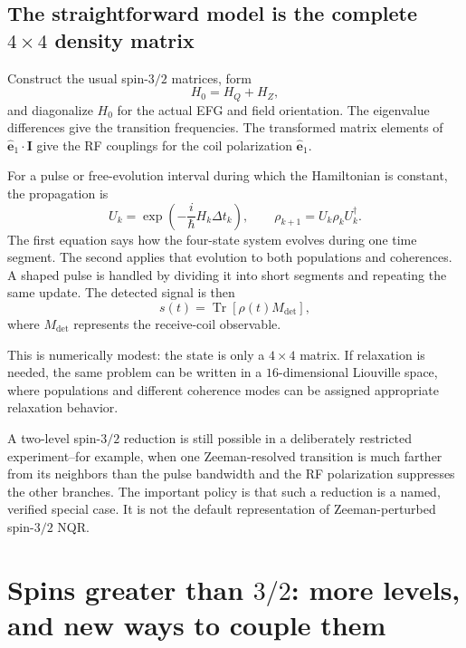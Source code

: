 \documentclass[11pt,letterpaper]{article}
\newcommand{\Tr}{\operatorname{Tr}}
\begin{document}
\subsection{The straightforward model is the complete $4\times4$ density matrix}

Construct the usual spin-$3/2$ matrices, form
\begin{equation}
H_0=H_Q+H_Z,
\end{equation}
and diagonalize $H_0$ for the actual EFG and field orientation. The eigenvalue differences give the transition frequencies. The transformed matrix elements of $\hat{\mathbf e}_1\cdot\mathbf I$ give the RF couplings for the coil polarization $\hat{\mathbf e}_1$.

For a pulse or free-evolution interval during which the Hamiltonian is constant, the propagation is
\begin{equation}
U_k=\exp\!\left(-\frac{i}{\hbar}H_k\Delta t_k\right),
\qquad
\rho_{k+1}=U_k\rho_kU_k^{\dagger}.
\label{eq:propagate}
\end{equation}
The first equation says how the four-state system evolves during one time segment. The second applies that evolution to both populations and coherences. A shaped pulse is handled by dividing it into short segments and repeating the same update. The detected signal is then
\begin{equation}
s(t)=\Tr\!\left[\rho(t)M_{\mathrm{det}}\right],
\end{equation}
where $M_{\mathrm{det}}$ represents the receive-coil observable.

This is numerically modest: the state is only a $4\times4$ matrix. If relaxation is needed, the same problem can be written in a $16$-dimensional Liouville space, where populations and different coherence modes can be assigned appropriate relaxation behavior.\cite{harel2006,odin2017}

A two-level spin-$3/2$ reduction is still possible in a deliberately restricted experiment--for example, when one Zeeman-resolved transition is much farther from its neighbors than the pulse bandwidth and the RF polarization suppresses the other branches. The important policy is that such a reduction is a named, verified special case. It is not the default representation of Zeeman-perturbed spin-$3/2$ NQR.

\section{Spins greater than $3/2$: more levels, and new ways to couple them}
\end{document}
